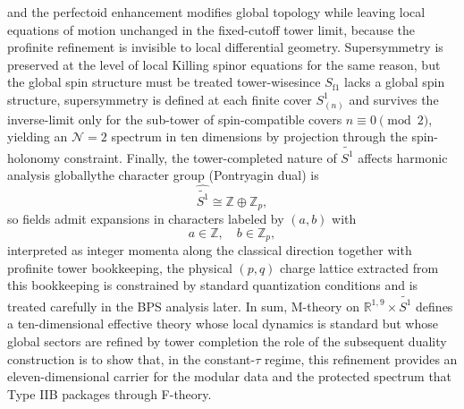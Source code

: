 \documentclass[11pt]{article}
\theoremstyle{remark}
\newcommand{\Z}{\mathbb{Z}}
\newcommand{\R}{\mathbb{R}}
\newcommand{\tS}{\widetilde{S^{1}}}
\begin{document}
and the perfectoid enhancement modifies global topology while leaving local equations of motion unchanged in the fixed-cutoff tower limit, because the profinite refinement is invisible to local differential geometry. Supersymmetry is preserved at the level of local Killing spinor equations for the same reason, but the global spin structure must be treated tower-wise\:since \(S_{\mathrm f1}\) lacks a global spin structure, supersymmetry is defined at each finite cover \(S^{1}_{(n)}\) and survives the inverse-limit only for the sub-tower of spin-compatible covers \(n\equiv 0\pmod 2\), yielding an \(\mathcal{N}=2\) spectrum in ten dimensions by projection through the spin-holonomy constraint. Finally, the tower-completed nature of \(\tS\) affects harmonic analysis globally\:the character group (Pontryagin dual) is
\begin{equation}
\widehat{\tS} \cong \Z \oplus \Z_p,
\end{equation}
so fields admit expansions in characters labeled by \((a,b)\) with
\begin{equation}
a \in \Z, \quad b \in \Z_p,
\end{equation}
interpreted as integer momenta along the classical direction together with profinite tower bookkeeping, the physical \((p,q)\) charge lattice extracted from this bookkeeping is constrained by standard quantization conditions and is treated carefully in the BPS analysis later. In sum, M-theory on \(\R^{1,9}\times \tS\) defines a ten-dimensional effective theory whose local dynamics is standard but whose global sectors are refined by tower completion\; the role of the subsequent duality construction is to show that, in the constant-\(\tau\) regime, this refinement provides an eleven-dimensional carrier for the modular data and the protected spectrum that Type IIB packages through F-theory.
\end{document}
